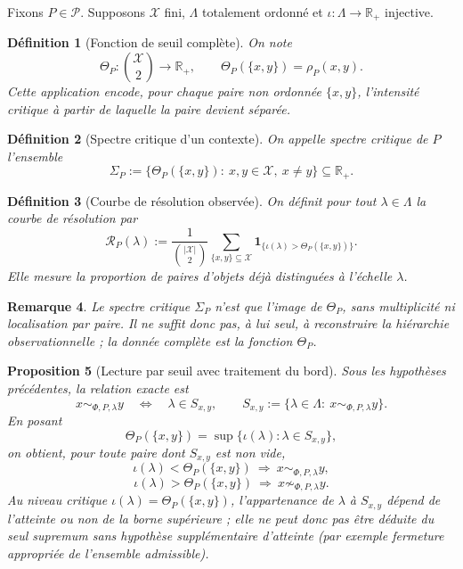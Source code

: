 \documentclass[11pt,a4paper,openany]{book}
\newtheorem{definition}{Définition}[chapter]
\newtheorem{proposition}[definition]{Proposition}
\newtheorem{remark}[definition]{Remarque}
\begin{document}
Fixons \(P\in\mathcal P\). Supposons \(\mathcal X\) fini, \(\Lambda\) totalement ordonné et \(\iota:\Lambda\to\mathbb R_+\) injective.

\begin{definition}[Fonction de seuil complète]
On note
\[
\Theta_P:\binom{\mathcal X}{2}\longrightarrow \mathbb R_+,
\qquad
\Theta_P(\{x,y\})=\rho_P(x,y).
\]
Cette application encode, pour chaque paire non ordonnée \(\{x,y\}\), l'intensité critique à partir de laquelle la paire devient séparée.
\end{definition}

\begin{definition}[Spectre critique d'un contexte]
On appelle \emph{spectre critique} de \(P\) l'ensemble
\[
\Sigma_P:=\{\Theta_P(\{x,y\}):\ x,y\in\mathcal X,\ x\neq y\}\subseteq \mathbb R_+.
\]
\end{definition}

\begin{definition}[Courbe de résolution observée]
On définit pour tout \(\lambda\in\Lambda\) la courbe de résolution par
\[
\mathcal R_P(\lambda)
:=
\frac{1}{\binom{|\mathcal X|}{2}}
\sum_{\{x,y\}\subseteq\mathcal X}
\mathbf 1_{\{\iota(\lambda)>\Theta_P(\{x,y\})\}}.
\]
Elle mesure la proportion de paires d'objets déjà distinguées à l'échelle \(\lambda\).
\end{definition}

\begin{remark}
Le spectre critique \(\Sigma_P\) n'est que l'image de \(\Theta_P\), sans multiplicité ni localisation par paire. Il ne suffit donc pas, à lui seul, à reconstruire la hiérarchie observationnelle ; la donnée complète est la fonction \(\Theta_P\).
\end{remark}

\begin{proposition}[Lecture par seuil avec traitement du bord]
Sous les hypothèses précédentes, la relation exacte est
\[
x\sim_{\Phi,P,\lambda}y
\quad\Longleftrightarrow\quad
\lambda\in S_{x,y},
\qquad
S_{x,y}:=\{\lambda\in\Lambda:\ x\sim_{\Phi,P,\lambda}y\}.
\]
En posant
\[
\Theta_P(\{x,y\})=\sup\{\iota(\lambda):\lambda\in S_{x,y}\},
\]
on obtient, pour toute paire dont \(S_{x,y}\) est non vide,
\[
\iota(\lambda)<\Theta_P(\{x,y\})\ \Longrightarrow\ x\sim_{\Phi,P,\lambda}y,
\]
\[
\iota(\lambda)>\Theta_P(\{x,y\})\ \Longrightarrow\ x\not\sim_{\Phi,P,\lambda}y.
\]
Au niveau critique \(\iota(\lambda)=\Theta_P(\{x,y\})\), l'appartenance de \(\lambda\) à \(S_{x,y}\) dépend de l'atteinte ou non de la borne supérieure ; elle ne peut donc pas être déduite du seul supremum sans hypothèse supplémentaire d'atteinte (par exemple fermeture appropriée de l'ensemble admissible).
\end{proposition}
\end{document}
